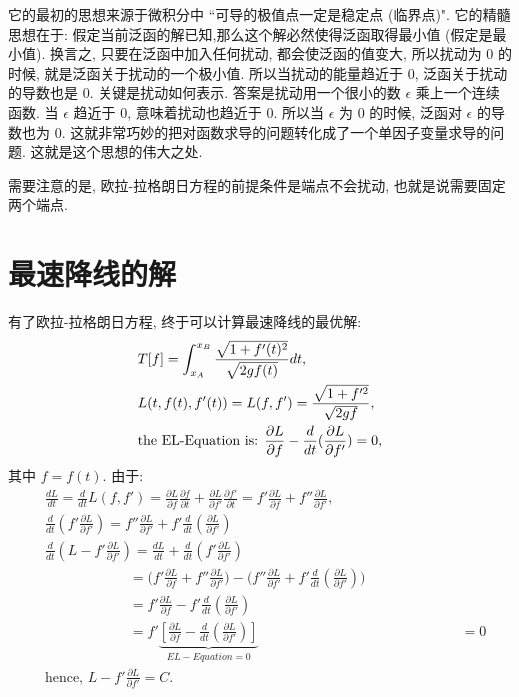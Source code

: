 \documentclass[cn,hazy,blue,14pt,screen]{./cls/elegantnote}
\begin{document}
它的最初的思想来源于微积分中 ``可导的极值点一定是稳定点 (临界点)". 它的{\color{red}精髓思想}在于: 假定当前泛函的解已知,那么这个解必然使得泛函取得最小值 (假定是最小值). 换言之, 只要在泛函中加入任何扰动, 都会使泛函的值变大, 所以扰动为 $ 0 $ 的时候, 就是泛函关于扰动的一个极小值. 所以当扰动的能量趋近于 $ 0 $, 泛函关于扰动的导数也是 $ 0 $. 关键是扰动如何表示. 答案是扰动用一个很小的数 $ \epsilon $ 乘上一个连续函数. 当 $ \epsilon $ 趋近于 $ 0 $, 意味着扰动也趋近于 $ 0 $. 所以当 $ \epsilon $ 为 $ 0 $ 的时候, 泛函对 $ \epsilon $ 的导数也为 $ 0 $. 这就非常巧妙的把对函数求导的问题转化成了一个单因子变量求导的问题. 这就是这个思想的伟大之处.

需要注意的是, 欧拉-拉格朗日方程的前提条件是端点不会扰动, 也就是说需要固定两个端点.


\section{最速降线的解}
有了欧拉-拉格朗日方程, 终于可以计算最速降线的最优解:
\begin{align}\label{eq1}
 	&T[f] = \int_{x_A}^{x_B} \frac{\sqrt{1+f'(t)^2}}{\sqrt{2gf(t)}} dt,\notag \\
 	&L(t,f(t),f'(t)) = L(f,f') = \frac{\sqrt{1+f'^2}}{\sqrt{2gf}}, \\
 	&\text{the EL-Equation is: } \frac{\partial L}{\partial f} - \frac{d}{dt}(\frac{\partial L}{\partial f'}) = 0, \notag
\end{align}
其中 $ f = f(t) $. 由于:
\begin{align*}
 	&\frac{dL}{dt} = \frac{d}{dt}L(f,f') = \frac{\partial L}{\partial f}\frac{\partial f}{\partial t} + \frac{\partial L}{\partial f'}\frac{\partial f'}{\partial t} = f'\frac{\partial L}{\partial f} + f''\frac{\partial L}{\partial f'}, \\
 	&\frac{d}{dt}(f'\frac{\partial L}{\partial f'}) = f''\frac{\partial L}{\partial f'} + f'\frac{d}{dt}(\frac{\partial L}{\partial f'}) \\
 	&\frac{d}{dt}(L-f'\frac{\partial L}{\partial f'}) = \frac{dL}{dt} + \frac{d}{dt}(f'\frac{\partial L}{\partial f'}) \\
 	&\hspace{6em} = \Big(f'\frac{\partial L}{\partial f} + f''\frac{\partial L}{\partial f'}\Big) - \Big(f''\frac{\partial L}{\partial f'} + f'\frac{d}{dt}(\frac{\partial L}{\partial f'}) \Big) \\
 	&\hspace{6em} = f'\frac{\partial L}{\partial f} - f'\frac{d}{dt}(\frac{\partial L}{\partial f'}) \\
 	&\hspace{6em} = f'\underset{EL-Equation = 0}{\underbrace{\left[\frac{\partial L}{\partial f}- \frac{d}{dt}(\frac{\partial L}{\partial f'}) \right]}}
 	&\hspace{6em} = 0 \\
 	&\text{hence, } L - f'\frac{\partial L}{\partial f'} = C.
\end{align*}
\end{document}

